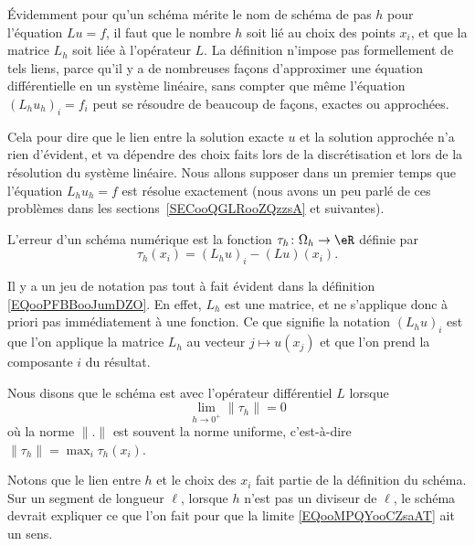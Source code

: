\begin{normaltext}
	Évidemment pour qu'un schéma mérite le nom de schéma de pas \( h\) pour l'équation \( Lu=f\), il faut que le nombre \( h\) soit lié au choix des points \( x_i\), et que la matrice \( L_h\) soit liée à l'opérateur \( L\). La définition n'impose pas formellement de tels liens, parce qu'il y a de nombreuses façons d'approximer une équation différentielle en un système linéaire, sans compter que même l'équation \( (L_hu_h)_i=f_i\) peut se résoudre de beaucoup de façons, exactes ou approchées.

	Cela pour dire que le lien entre la solution exacte \( u\) et la solution approchée n'a rien d'évident, et va dépendre des choix faits lors de la discrétisation et lors de la résolution du système linéaire. Nous allons supposer dans un premier temps que l'équation \( L_hu_h=f\) est résolue exactement (nous avons un peu parlé de ces problèmes dans les sections~\ref{SECooQGLRooZQzzsA} et suivantes).
\end{normaltext}

\begin{definition}
	L'erreur  d'un schéma numérique est la fonction \( \tau_h\colon \Omega_h\to \eR\) définie par
	\begin{equation}        \label{EQooPFBBooJumDZO}
		\tau_h(x_i)=(L_hu)_i-(Lu)(x_i).
	\end{equation}
\end{definition}
Il y a un jeu de notation pas tout à fait évident dans la définition \eqref{EQooPFBBooJumDZO}. En effet, \( L_h\) est une matrice, et ne s'applique donc à priori pas immédiatement à une fonction. Ce que signifie la notation \( (L_hu)_i\) est que l'on applique la matrice \( L_h\) au vecteur \( j\mapsto u(x_j)\) et que l'on prend la composante \( i\) du résultat.

\begin{definition}
	Nous disons que le schéma est  avec l'opérateur différentiel \( L\) lorsque
	\begin{equation}        \label{EQooMPQYooCZsaAT}
		\lim_{h\to 0^+} \| \tau_h \|=0
	\end{equation}
	où la norme \( \| . \|\) est souvent la norme uniforme, c'est-à-dire \( \| \tau_h \|=\max_i\tau_h(x_i)\).
\end{definition}

Notons que le lien entre \( h\) et le choix des \( x_i\) fait partie de la définition du schéma. Sur un segment de longueur \( \ell\), lorsque \( h\) n'est pas un diviseur de \( \ell\), le schéma devrait expliquer ce que l'on fait pour que la limite \eqref{EQooMPQYooCZsaAT} ait un sens.

